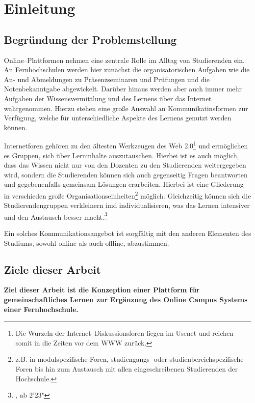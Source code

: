 \section{Einleitung} %
\label{sec:einleitung}

\subsection{Begründung der Problemstellung} %
\label{sub:begrundung_der_problemstellung}

Online--Plattformen nehmen eine zentrale Rolle im Alltag von Studierenden ein. An Fernhochschulen werden hier zunächst die organisatorischen Aufgaben wie die An- und Abmeldungen zu Präsenzseminaren und Prüfungen und die Notenbekanntgabe abgewickelt. Darüber hinaus werden aber auch immer mehr Aufgaben der Wissensvermittlung und des Lernens über das Internet wahrgenommen. Hierzu stehen eine große Auswahl an Kommunikatinsformen zur Verfügung, welche für unterschiedliche Aspekte des Lernens genutzt werden können.

Internetforen gehören zu den ältesten Werkzeugen des Web 2.0\footnote{Die Wurzeln der Internet–Diskussionsforen liegen im Usenet und reichen somit in die Zeiten vor dem \ac{WWW} zurück.} und ermöglichen es Gruppen, sich über Lerninhalte auszutauschen. Hierbei ist es auch möglich, dass das Wissen nicht nur von den Dozenten zu den Studierenden weitergegeben wird, sondern die Studierenden können sich auch gegenseitig Fragen beantworten und gegebenenfalls gemeinsam Lösungen erarbeiten. Hierbei ist eine Gliederung in verschieden große Organisationseinheiten\footnote{z.B. in modulspezifische Foren, studiengangs- oder studienbereichspezifische Foren bis hin zum Austausch mit allen eingeschreibenen Studierenden der Hochschule.} möglich. Gleichzeitig können sich die  Studierendengruppen verkleinern imd individualisieren, was das Lernen intensiver und den Austausch besser macht.\footnote{\cite{roegner:trends}, ab 2'23"}

Ein solches Kommunikationsangebot ist sorgfältig mit den anderen Elementen des Studiums, sowohl online als auch offline, abzustimmen.

\subsection{Ziele dieser Arbeit} %
\label{sub:ziele_dieser_arbeit}
\textbf{Ziel dieser Arbeit ist die Konzeption einer Plattform für gemeinschaftliches Lernen zur Ergänzung des Online Campus Systems einer Fernhochschule.}

